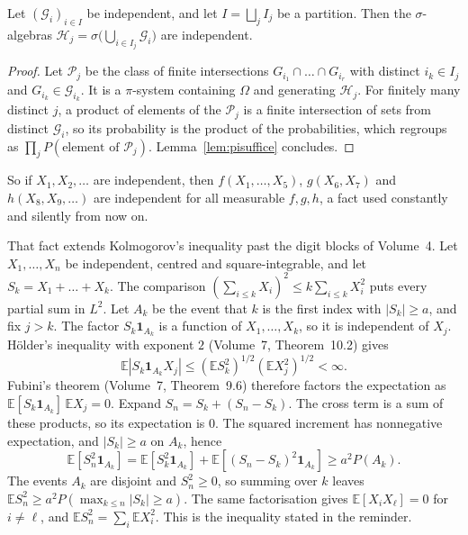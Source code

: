 \begin{proposition}[grouping]\label{prop:grouping}
Let $(\mathcal G_i)_{i\in I}$ be independent, and let $I=\bigsqcup_jI_j$ be a partition. Then the $\sigma$-algebras
$\mathcal H_j=\sigma\bigl(\bigcup_{i\in I_j}\mathcal G_i\bigr)$ are independent.
\end{proposition}
\begin{proof}
Let $\mathcal P_j$ be the class of finite intersections $G_{i_1}\cap\dots\cap G_{i_r}$ with distinct $i_k\in I_j$ and
$G_{i_k}\in\mathcal G_{i_k}$. It is a $\pi$-system containing $\Omega$ and generating $\mathcal H_j$. For finitely many
distinct $j$, a product of elements of the $\mathcal P_j$ is a finite intersection of sets from distinct $\mathcal G_i$, so
its probability is the product of the probabilities, which regroups as $\prod_jP(\text{element of }\mathcal P_j)$. Lemma~\ref{lem:pisuffice}
 concludes.
\end{proof}

So if $X_1,X_2,\dots$ are independent, then $f(X_1,\dots,X_5)$, $g(X_6,X_7)$ and $h(X_8,X_9,\dots)$ are independent for all
measurable $f,g,h$, a fact used constantly and silently from now on.

That fact extends Kolmogorov's inequality past the digit blocks of Volume~4. Let $X_1,\dots,X_n$ be independent, centred and square-integrable, and let $S_k=X_1+\dots+X_k$. The comparison $(\sum_{i\le k}X_i)^2\le k\sum_{i\le k}X_i^2$ puts every partial sum in $L^2$. Let $A_k$ be the event that $k$ is the first index with $|S_k|\ge a$, and fix $j>k$. The factor $S_k\mathbf 1_{A_k}$ is a function of $X_1,\dots,X_k$, so it is independent of $X_j$. H\"older's inequality with exponent $2$ (Volume~7, Theorem~10.2) gives
\[
\mathbb E|S_k\mathbf 1_{A_k}X_j|\le(\mathbb ES_k^2)^{1/2}(\mathbb EX_j^2)^{1/2}<\infty.
\]
Fubini's theorem (Volume~7, Theorem~9.6) therefore factors the expectation as $\mathbb E[S_k\mathbf 1_{A_k}]\,\mathbb EX_j=0$. Expand $S_n=S_k+(S_n-S_k)$. The cross term is a sum of these products, so its expectation is $0$. The squared increment has nonnegative expectation, and $|S_k|\ge a$ on $A_k$, hence
\[
\mathbb E[S_n^2\mathbf 1_{A_k}]
=\mathbb E[S_k^2\mathbf 1_{A_k}]+\mathbb E[(S_n-S_k)^2\mathbf 1_{A_k}]
\ge a^2P(A_k).
\]
The events $A_k$ are disjoint and $S_n^2\ge0$, so summing over $k$ leaves $\mathbb ES_n^2\ge a^2P(\max_{k\le n}|S_k|\ge a)$. The same factorisation gives $\mathbb E[X_iX_\ell]=0$ for $i\ne\ell$, and $\mathbb ES_n^2=\sum_i\mathbb EX_i^2$. This is the inequality stated in the reminder.

